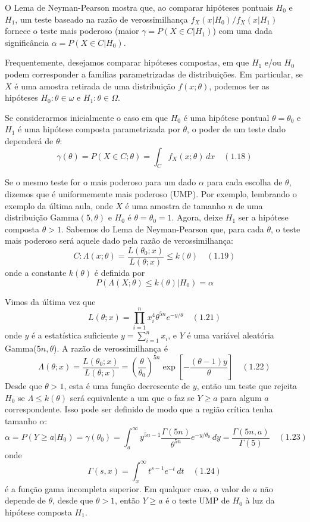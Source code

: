 \documentclass[12pt]{report}
\begin{document}
O Lema de Neyman-Pearson mostra que, ao comparar hipóteses pontuais \(H_0\) e \(H_1\), um teste baseado na razão de verossimilhança \(f_X(x|H_0)/f_X(x|H_1)\) fornece o teste mais poderoso (maior \(\gamma = P(X \in C|H_1)\)) com uma dada significância \(\alpha = P(X \in C|H_0)\).

Frequentemente, desejamos comparar hipóteses compostas, em que \(H_1\) e/ou \(H_0\) podem corresponder a famílias parametrizadas de distribuições. Em particular, se \(X\) é uma amostra retirada de uma distribuição \(f(x; \theta)\), podemos ter as hipóteses \(H_0 : \theta \in \omega\) e \(H_1 : \theta \in \Omega\).

Se considerarmos inicialmente o caso em que \(H_0\) é uma hipótese pontual \(\theta = \theta_0\) e \(H_1\) é uma hipótese composta parametrizada por \(\theta\), o poder de um teste dado dependerá de \(\theta\):
\[
\gamma(\theta) = P(X \in C; \theta) = \int_{C} f_X(x; \theta) \, dx \quad (1.18)
\]

Se o mesmo teste for o mais poderoso para um dado \(\alpha\) para cada escolha de \(\theta\), dizemos que é uniformemente mais poderoso (UMP). Por exemplo, lembrando o exemplo da última aula, onde \(X\) é uma amostra de tamanho \(n\) de uma distribuição \(\text{Gamma}(5, \theta)\) e \(H_0\) é \(\theta = \theta_0 = 1\). Agora, deixe \(H_1\) ser a hipótese composta \(\theta > 1\). Sabemos do Lema de Neyman-Pearson que, para cada \(\theta\), o teste mais poderoso será aquele dado pela razão de verossimilhança:
\[
C : \Lambda(x; \theta) = \frac{L(\theta_0; x)}{L(\theta; x)} \leq k(\theta) \quad (1.19)
\]
onde a constante \(k(\theta)\) é definida por
\[
P\left(\Lambda(X; \theta) \leq k(\theta) | H_0\right) = \alpha
\]

Vimos da última vez que
\[
L(\theta; x) = \prod_{i=1}^{n} x_i^{4} \theta^{5n} e^{-y/\theta} \quad (1.21)
\]
onde \(y\) é a estatística suficiente \(y = \sum_{i=1}^{n} x_i\), e \(Y\) é uma variável aleatória Gamma(\(5n, \theta\)). A razão de verossimilhança é
\[
\Lambda(\theta; x) = \frac{L(\theta_0; x)}{L(\theta; x)} = \left(\frac{\theta}{\theta_0}\right)^{5n} \exp\left[-\frac{(\theta - 1)y}{\theta}\right] \quad (1.22)
\]
Desde que \(\theta > 1\), esta é uma função decrescente de \(y\), então um teste que rejeita \(H_0\) se \(\Lambda \leq k(\theta)\) será equivalente a um que o faz se \(Y \geq a\) para algum \(a\) correspondente. Isso pode ser definido de modo que a região crítica tenha tamanho \(\alpha\):
\[
\alpha = P(Y \geq a|H_0) = \gamma(\theta_0) = \int_{a}^{\infty} y^{5n-1} \frac{\Gamma(5n)}{\theta^{5n}} e^{-y/\theta_0} \, dy = \frac{\Gamma(5n, a)}{\Gamma(5)} \quad (1.23)
\]
onde
\[
\Gamma(s, x) = \int_{x}^{\infty} t^{s-1} e^{-t} \, dt \quad (1.24)
\]
é a função gama incompleta superior. Em qualquer caso, o valor de \(a\) não depende de \(\theta\), desde que \(\theta > 1\), então \(Y \geq a\) é o teste UMP de \(H_0\) à luz da hipótese composta \(H_1\).
\end{document}
